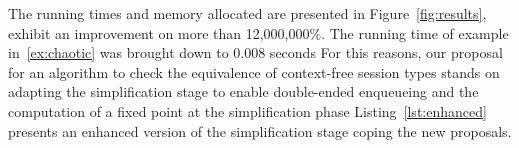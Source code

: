 The running times and memory allocated are presented in
Figure~\ref{fig:results}, exhibit an improvement on more than
12,000,000\%. The running time of example in~\eqref{ex:chaotic} was
brought down to 0.008 seconds  For this reasons, our
proposal for an algorithm to check the equivalence of context-free
session types stands on adapting the simplification stage to enable
double-ended enqueueing and the computation of a fixed point at the
simplification phase Listing~\ref{lst:enhanced} presents an enhanced
version of the simplification stage coping the new proposals.



